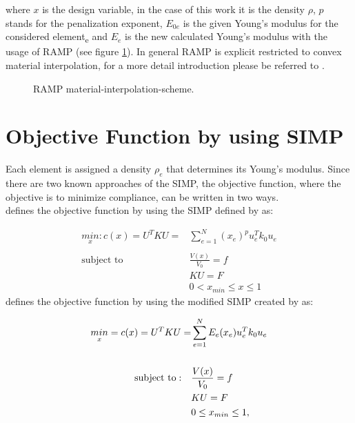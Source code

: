 where\textbf{ $x$} is the design variable, in the case of this work it is the density $\rho $, \textbf{$p$} stands for the penalization exponent, \textbf{$E_{0e}$} is the given Young's modulus for the considered element\textsubscript{e} and\textbf{ $E_e$} is the new calculated Young's modulus with the usage of RAMP (see figure \ref{fig_RAMP_sceme}). In general RAMP is explicit restricted to convex material interpolation, for a more detail introduction please be referred to \cite{Stolpe.2001}.\\


\begin{figure}[!h]
\centering
{}
\caption{RAMP material-interpolation-scheme.}
\label{fig_RAMP_sceme}
\end{figure}
%

\section{Objective Function by using SIMP}
\label{subsection_obj_SIMP}

Each element is assigned a density \textbf{$\rho_{e}$ } that determines its Young's modulus. Since there are two known approaches of the SIMP, the objective function, where the objective is to minimize compliance, can be written in two ways.\\

\cite{Sigmund.2001} defines the objective function by using the SIMP defined by \cite{Bendse.1988} as:

\begin{align}
\underset{x}{min} : c(x) = U^TKU =& \sum_{e = 1}^N (x_e)^pu_e^Tk_0u_e
\label{equ_objective_func_99}
\\ \nonumber \\
\nonumber
\text{subject to} \quad & \frac{V(x)}{V_0} = f \\
\nonumber
& KU = F \\
\nonumber
&0<x_{min} \leq x \leq1
\end{align}
\cite{Andreassen.2011} defines the objective function by using the modified SIMP created by \cite{Sigmund.2007} as:

\begin{align}
\underset{x}{min} = c (x) = U^TKU = \displaystyle &\sum_{e = 1}^N E_e(x_e)u_e^Tk_0u_e 
\label{equ_objective_function_88} \\
\nonumber \\ \nonumber 
 \text{subject to}: \quad &\frac{V(x)}{V_0} = f \\\nonumber
& KU = F\\\nonumber
& 0\leq x_{min} \leq1, \nonumber
\end{align}

